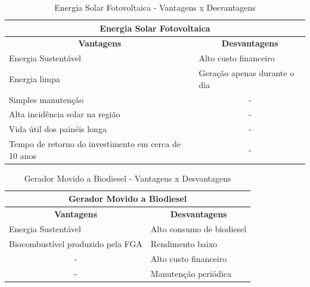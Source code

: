 \begin{table}[h]
  \centering
  \caption{Energia Solar Fotovoltaica - Vantagens x Desvantagens}
  \label{my-label}
  \begin{tabular}{|l|c|}
    \hline
    \multicolumn{2}{|c|}{\textbf{Energia Solar Fotovoltaica}}                                                \\ \hline
    \multicolumn{1}{|c|}{\textbf{Vantagens}}             & \textbf{Desvantagens}                             \\ \hline
    Energia Sustentável                                  & \multicolumn{1}{l|}{Alto custo financeiro}        \\ \hline
    Energia limpa                                        & \multicolumn{1}{l|}{Geração apenas durante o dia} \\ \hline
    Simples manutenção                                   & -                                                 \\ \hline
    Alta incidência solar na região                      & -                                                 \\ \hline
    Vida útil dos painéis longa                          & -                                                 \\ \hline
    Tempo de retorno do investimento em cerca de 10 anos & -                                                 \\ \hline
  \end{tabular}
\end{table}


\begin{table}[h]
  \centering
  \caption{Gerador Movido a Biodiesel - Vantagens x Desvantagens}
  \label{my-label}
  \begin{tabular}{|c|l|}
    \hline
    \multicolumn{2}{|c|}{\textbf{Gerador Movido a Biodiesel}}                                            \\ \hline
    \textbf{Vantagens}                                      & \multicolumn{1}{c|}{\textbf{Desvantagens}} \\ \hline
    \multicolumn{1}{|l|}{Energia Sustentável}               & Alto consumo de biodiesel                  \\ \hline
    \multicolumn{1}{|l|}{Biocombustível produzido pela FGA} & Rendimento baixo                           \\ \hline
    -                                                       & Alto custo financeiro                      \\ \hline
    -                                                       & Manutenção periódica                       \\ \hline
  \end{tabular}
\end{table}


